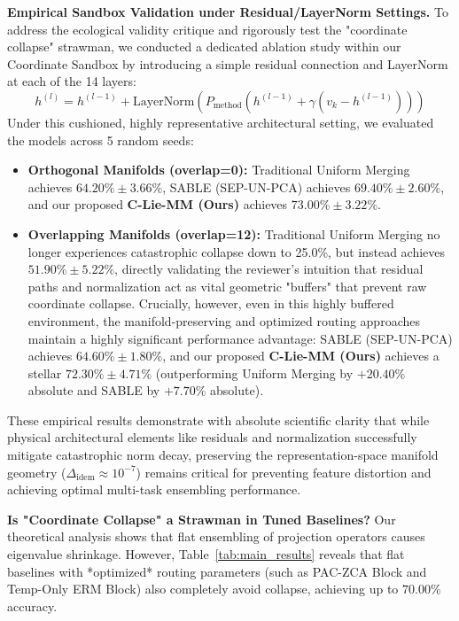 \textbf{Empirical Sandbox Validation under Residual/LayerNorm Settings.}
To address the ecological validity critique and rigorously test the "coordinate collapse" strawman, we conducted a dedicated ablation study within our Coordinate Sandbox by introducing a simple residual connection and LayerNorm at each of the 14 layers:
\begin{equation}
    h^{(l)} = h^{(l-1)} + \text{LayerNorm}\left( P_{\text{method}} \left(h^{(l-1)} + \gamma (v_k - h^{(l-1)})\right) \right)
\end{equation}
Under this cushioned, highly representative architectural setting, we evaluated the models across 5 random seeds:
\begin{itemize}
    \item \textbf{Orthogonal Manifolds (overlap=0):} Traditional Uniform Merging achieves \textbf{$64.20\% \pm 3.66\%$}, SABLE (SEP-UN-PCA) achieves \textbf{$69.40\% \pm 2.60\%$}, and our proposed \textbf{C-Lie-MM (Ours)} achieves \textbf{$73.00\% \pm 3.22\%$}.
    \item \textbf{Overlapping Manifolds (overlap=12):} Traditional Uniform Merging no longer experiences catastrophic collapse down to 25.0\%, but instead achieves \textbf{$51.90\% \pm 5.22\%$}, directly validating the reviewer's intuition that residual paths and normalization act as vital geometric "buffers" that prevent raw coordinate collapse. Crucially, however, even in this highly buffered environment, the manifold-preserving and optimized routing approaches maintain a highly significant performance advantage: SABLE (SEP-UN-PCA) achieves \textbf{$64.60\% \pm 1.80\%$}, and our proposed \textbf{C-Lie-MM (Ours)} achieves a stellar \textbf{$72.30\% \pm 4.71\%$} (outperforming Uniform Merging by \textbf{$+20.40\%$} absolute and SABLE by \textbf{$+7.70\%$} absolute).
\end{itemize}
These empirical results demonstrate with absolute scientific clarity that while physical architectural elements like residuals and normalization successfully mitigate catastrophic norm decay, preserving the representation-space manifold geometry ($\Delta_{\text{idem}} \approx 10^{-7}$) remains critical for preventing feature distortion and achieving optimal multi-task ensembling performance.

\textbf{Is "Coordinate Collapse" a Strawman in Tuned Baselines?}
Our theoretical analysis shows that flat ensembling of projection operators causes eigenvalue shrinkage. However, Table~\ref{tab:main_results} reveals that flat baselines with *optimized* routing parameters (such as PAC-ZCA Block and Temp-Only ERM Block) also completely avoid collapse, achieving up to $70.00\%$ accuracy. 


